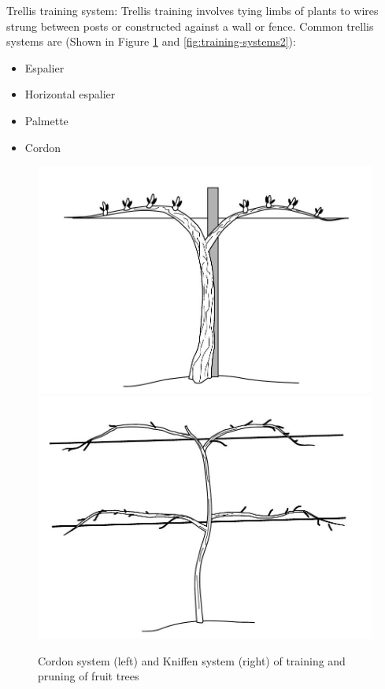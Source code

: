 \documentclass[
]{article}
\providecommand{\tightlist}{%
  \setlength{\itemsep}{0pt}\setlength{\parskip}{0pt}}
\begin{document}
Trellis training system: Trellis training involves tying limbs of plants to wires strung between posts or constructed against a wall or fence. Common trellis systems are (Shown in Figure \ref{fig:training-systems} and \ref{fig:training-systems2}):

\begin{itemize}
\tightlist
\item
  Espalier
\item
  Horizontal espalier
\item
  Palmette
\item
  Cordon
\end{itemize}

\begin{figure}

{\centering \includegraphics[width=.48\linewidth]{./../images/fruits/cordon} \includegraphics[width=.48\linewidth]{./../images/fruits/kniffen} 

}

\caption{Cordon system (left) and Kniffen system (right) of training and pruning of fruit trees}\label{fig:training-systems}
\end{figure}
\end{document}
